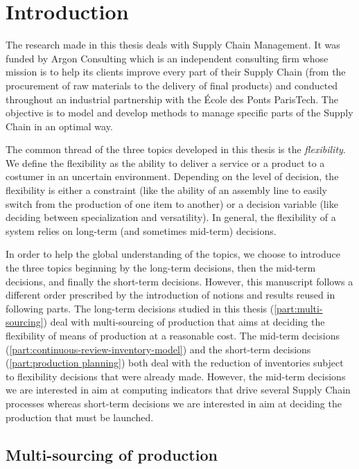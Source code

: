 \chapter{Introduction}
\label{chap:intro:en}


The research made in this thesis deals with Supply Chain Management.
It was funded by Argon Consulting which is an independent consulting firm whose mission is to help its clients improve every part of their Supply Chain (from the procurement of raw materials to the delivery of final products) and conducted throughout an industrial partnership with the \'Ecole des Ponts ParisTech.
The objective is to model and develop methods to manage specific parts of the Supply Chain in an optimal way.


The common thread of the three topics developed in this thesis is the \emph{flexibility}.
We define the flexibility as the ability to deliver a service or a product to a costumer in an uncertain environment.
Depending on the level of decision, the flexibility is either a constraint (like the ability of an assembly line to easily switch from the production of one item to another) or a decision variable (like deciding between specialization and versatility).
In general, the flexibility of a system relies on long-term (and sometimes mid-term) decisions.


In order to help the global understanding of the topics, we choose to introduce the three topics beginning by the long-term decisions, then the mid-term decisions, and finally the short-term decisions.
However, this manuscript follows a different order prescribed by the introduction of notions and results reused in following parts.
The long-term decisions studied in this thesis (\cref{part:multi-sourcing}) deal with multi-sourcing of production that aims at deciding the flexibility of means of production at a reasonable cost.
The mid-term decisions (\cref{part:continuous-review-inventory-model}) and the short-term decisions (\cref{part:production planning}) both deal with the reduction of inventories subject to flexibility decisions that were already made.
However, the mid-term decisions we are interested in aim at computing indicators that drive several Supply Chain processes whereas short-term decisions we are interested in aim at deciding the production that must be launched.


\section{Multi-sourcing of production}
\label{sec:intro:en:multi-sourcing}


